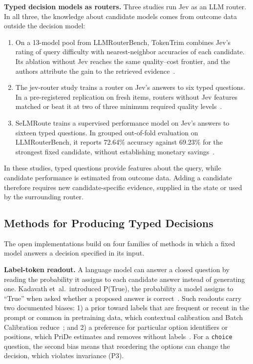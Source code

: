 \noindent\textbf{Typed decision models as routers.} Three studies run Jev as an LLM router. In all three, the knowledge about candidate models comes from outcome data outside the decision model:
\begin{enumerate}
\item On a 13-model pool from LLMRouterBench, TokenTrim combines Jev's rating of query difficulty with nearest-neighbor accuracies of each candidate. Its ablation without Jev reaches the same quality--cost frontier, and the authors attribute the gain to the retrieved evidence~\cite{tokentrim2026jevrouting}.
\item The jev-router study trains a router on Jev's answers to six typed questions. In a pre-registered replication on fresh items, routers without Jev features matched or beat it at two of three minimum required quality levels~\cite{rishirajfs2026jevrouter}.
\item SeLMRoute trains a supervised performance model on Jev's answers to sixteen typed questions. In grouped out-of-fold evaluation on LLMRouterBench, it reports 72.64\% accuracy against 69.23\% for the strongest fixed candidate, without establishing monetary savings~\cite{perifanis2026selmroute}.
\end{enumerate}
In these studies, typed questions provide features about the query, while candidate performance is estimated from outcome data. Adding a candidate therefore requires new candidate-specific evidence, supplied in the state or used by the surrounding router.

\subsection{Methods for Producing Typed Decisions}
\label{sec:mechanisms}

The open implementations build on four families of methods in which a fixed model answers a decision specified in its input.

\noindent\textbf{Label-token readout.} A language model can answer a closed question by reading the probability it assigns to each candidate answer instead of generating one. Kadavath et~al.\ introduced P(True), the probability a model assigns to ``True'' when asked whether a proposed answer is correct~\cite{kadavath2022language}. Such readouts carry two documented biases: 1) a prior toward labels that are frequent or recent in the prompt or common in pretraining data, which contextual calibration and Batch Calibration reduce~\cite{zhao2021calibrate,zhou2024batch}; and 2) a preference for particular option identifiers or positions, which PriDe estimates and removes without labels~\cite{zheng2024large}. For a \texttt{choice} question, the second bias means that reordering the options can change the decision, which violates invariance (P3).

